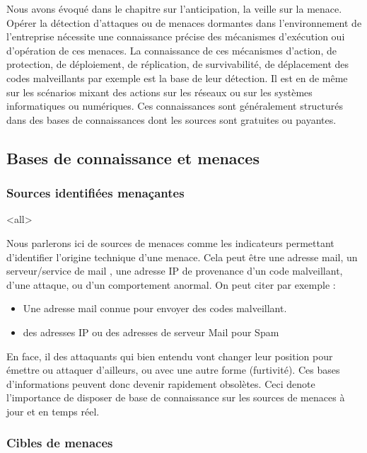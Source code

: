 Nous avons évoqué dans le chapitre sur l'anticipation, la veille sur la menace. Opérer la détection d'attaques ou de menaces dormantes dans l'environnement de l'entreprise nécessite une connaissance précise des mécanismes d'exécution oui d'opération de ces menaces.
La connaissance de ces mécanismes d'action, de protection, de déploiement, de réplication, de survivabilité, de déplacement des codes malveillants par exemple est la base de leur détection. Il est en de même sur les scénarios mixant des actions sur les réseaux ou sur les systèmes informatiques ou numériques.
Ces connaissances sont généralement structurés dans des bases de connaissances dont les sources sont gratuites ou payantes.

\subsection{Bases de connaissance et menaces}

\subsubsection{Sources identifiées menaçantes}

\mode<all>{
{
Nous parlerons ici de sources de menaces comme les indicateurs permettant d'identifier l'origine technique d'une menace. Cela peut être une adresse mail, un serveur/service de mail , une adresse IP de provenance d'un code malveillant, d'une attaque, ou d'un comportement anormal.
On peut citer par exemple  :
\begin{itemize}
  \item Une adresse mail connue pour envoyer des codes malveillant.
  \item des adresses IP ou des adresses de serveur Mail pour Spam
\end{itemize}
}}%




En face, il des attaquants qui bien entendu vont changer leur position pour émettre ou attaquer d'ailleurs, ou avec une autre forme (furtivité). Ces bases d'informations peuvent donc devenir rapidement obsolètes. Ceci denote l'importance de disposer de base de connaissance sur les sources de menaces à jour et en temps réel.

\subsubsection{Cibles de menaces}

